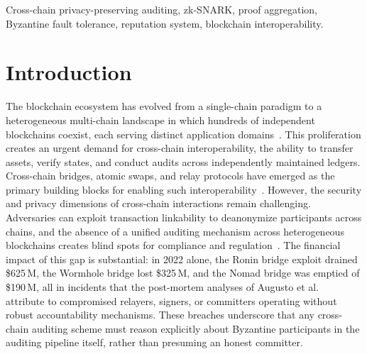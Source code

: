 \documentclass[journal]{IEEEtran}
\begin{document}
\begin{IEEEkeywords}
Cross-chain privacy-preserving auditing, zk-SNARK, proof aggregation, Byzantine fault tolerance, reputation system, blockchain interoperability.
\end{IEEEkeywords}

\section{Introduction}

The blockchain ecosystem has evolved from a single-chain paradigm to a heterogeneous multi-chain landscape in which hundreds of independent blockchains coexist, each serving distinct application domains~\cite{belchior2021survey, han2023survey}. This proliferation creates an urgent demand for cross-chain interoperability, the ability to transfer assets, verify states, and conduct audits across independently maintained ledgers. Cross-chain bridges, atomic swaps, and relay protocols have emerged as the primary building blocks for enabling such interoperability~\cite{zamyatin2019xclaim, herlihy2018atomic, xie2022zkbridge}. However, the security and privacy dimensions of cross-chain interactions remain challenging. Adversaries can exploit transaction linkability to deanonymize participants across chains, and the absence of a unified auditing mechanism across heterogeneous blockchains creates blind spots for compliance and regulation~\cite{augusto2024sok, liu2019auditing}. The financial impact of this gap is substantial: in 2022 alone, the Ronin bridge exploit drained \$625\,M, the Wormhole bridge lost \$325\,M, and the Nomad bridge was emptied of \$190\,M, all in incidents that the post-mortem analyses of Augusto et al.~\cite{augusto2024sok} attribute to compromised relayers, signers, or committers operating without robust accountability mechanisms. These breaches underscore that any cross-chain auditing scheme must reason explicitly about Byzantine participants in the auditing pipeline itself, rather than presuming an honest committer.
\end{document}
